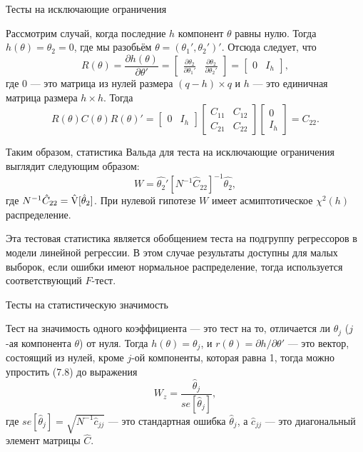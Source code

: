 \begin{center}
Тесты на исключающие ограничения
\end{center}

Рассмотрим случай, когда последние $h$ компонент $\theta$ равны нулю. Тогда $h(\theta) = \theta_2 = 0$, где мы разобьём $\theta = (\theta_1', \theta_2')'$. Отсюда следует, что
\[
R(\theta) = \frac{\partial{h(\theta)}}{\partial{\theta'}} = \begin{bmatrix} \frac{\partial{\theta_2}}{\partial{\theta_1'}} & \frac{\partial{\theta_2}}{\partial{\theta_2'}} \end{bmatrix} = \begin{bmatrix} 0 & I_h \end{bmatrix},
\]
где $0$ --- это матрица из нулей размера $(q - h) \times q$ и $h$ --- это единичная матрица размера $h \times h$. Тогда
\[
R(\theta)C(\theta)R(\theta)' = \begin{bmatrix} 0 & I_h \end{bmatrix} \begin{bmatrix} C_{11} & C_{12} \\ C_{21} & C_{22}\end{bmatrix} \begin{bmatrix} 0 \\ I_h \end{bmatrix} = C_{22}.
\]

Таким образом, статистика Вальда для теста на исключающие ограничения выглядит следующим образом:
\begin{equation}
W = \hat{\theta_2}'[N^{-1}\hat{C}_{22}]^{-1}\hat{\theta_2},
\end{equation}
где $N^{-1}\hat{C}_{22} = \hat{\mathrm{V}}[\hat{\theta}_2]$. При нулевой гипотезе $W$ имеет асмиптотическое $\chi^2(h)$ распределение.

Эта тестовая статистика является обобщением теста на подгруппу регрессоров в модели линейной регрессии. В этом случае результаты доступны для малых выборок, если ошибки имеют нормальное распределение, тогда используется соответствующий $F$-тест.

\begin{center}
Тесты на статистическую значимость
\end{center}

Тест на значимость одного коэффициента --- это тест на то, отличается ли $\theta_j$ ($j$-ая компонента $\theta$) от нуля. Тогда $h(\theta) = \theta_j$, и $r(\theta) = \partial{h}/\partial{\theta}'$ --- это вектор, состоящий из нулей, кроме $j$-ой компоненты, которая равна 1, тогда можно упростить (7.8) до выражения
\begin{equation}
W_z = \frac{\hat{\theta}_j}{se[\hat{\theta}_j]},
\end{equation}
где $se[\hat{\theta}_j] = \sqrt{N^{-1}\hat{c}_{jj}}$ --- это стандартная ошибка $\hat{\theta}_j$, а $\hat{c}_{jj}$ --- это диагональный элемент матрицы $\hat{C}$.

